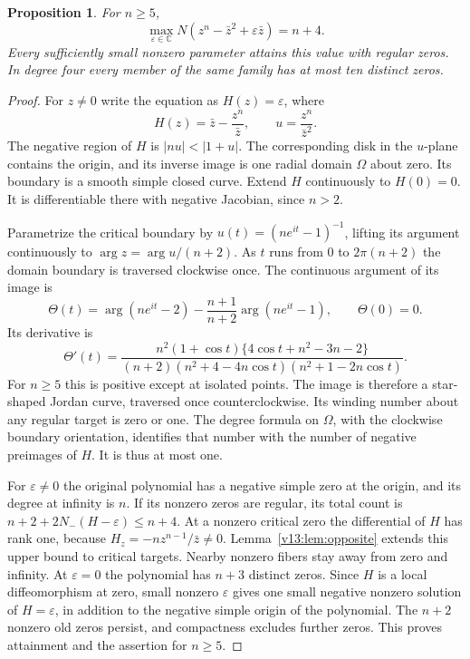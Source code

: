 \documentclass[UTF8,11pt]{ctexart}
\newtheorem{prop}[thm]{Proposition}
\theoremstyle{definition}
\numberwithin{equation}{section}
\newcommand{\C}{\mathbb C}\newcommand{\R}{\mathbb R}
\begin{document}
\begin{prop}\label{v13:prop:antithird}
For $n\ge5$,
\[
 \max_{\varepsilon\in\C}
 N(z^n-\bar z^2+\varepsilon\bar z)=n+4.
\]
Every sufficiently small nonzero parameter attains this value
with regular zeros. In degree four every member of the same
family has at most ten distinct zeros.
\end{prop}
\begin{proof}
For $z\ne0$ write the equation as $H(z)=\varepsilon$, where
\[
 H(z)=\bar z-\frac{z^n}{\bar z},\qquad
 u=\frac{z^n}{\bar z^2}.
\]
The negative region of $H$ is $|nu|<|1+u|$. The corresponding
disk in the $u$-plane contains the origin, and its inverse image
is one radial domain $\Omega$ about zero. Its boundary is a
smooth simple closed curve. Extend $H$ continuously to $H(0)=0$.
It is differentiable there with negative Jacobian, since $n>2$.

Parametrize the critical boundary by
$u(t)=(ne^{it}-1)^{-1}$, lifting its argument continuously to
$\arg z=\arg u/(n+2)$. As $t$ runs from $0$ to $2\pi(n+2)$
the domain boundary is traversed clockwise once. The continuous
argument of its image is
\[
 \Theta(t)=\arg(ne^{it}-2)
 -\frac{n+1}{n+2}\arg(ne^{it}-1),\qquad \Theta(0)=0.
\]
Its derivative is
\begin{equation}\label{v13:eq:antiderivative}
 \Theta'(t)=
 \frac{n^2(1+\cos t)\{4\cos t+n^2-3n-2\}}
 {(n+2)(n^2+4-4n\cos t)(n^2+1-2n\cos t)}.
\end{equation}
For $n\ge5$ this is positive except at isolated points.
The image is therefore a star-shaped Jordan curve, traversed
once counterclockwise. Its winding number about any regular
target is zero or one. The degree formula on $\Omega$, with
the clockwise boundary orientation, identifies that number
with the number of negative preimages of $H$. It is thus at
most one.

For $\varepsilon\ne0$ the original polynomial has a negative
simple zero at the origin, and its degree at infinity is $n$.
If its nonzero zeros are regular, its total count is
$n+2+2N_-(H-\varepsilon)\le n+4$.
At a nonzero critical zero the differential of $H$ has rank
one, because $H_z=-nz^{n-1}/\bar z\ne0$.
Lemma~\ref{v13:lem:opposite} extends this upper bound to
critical targets. Nearby nonzero fibers stay away from zero
and infinity. At $\varepsilon=0$ the polynomial has $n+3$
distinct zeros. Since $H$ is a local diffeomorphism at zero,
small nonzero $\varepsilon$ gives one small negative nonzero
solution of $H=\varepsilon$, in addition to the negative
simple origin of the polynomial. The $n+2$ nonzero old zeros
persist, and compactness excludes further zeros. This proves
attainment and the
assertion for $n\ge5$.


\end{proof}
\end{document}
